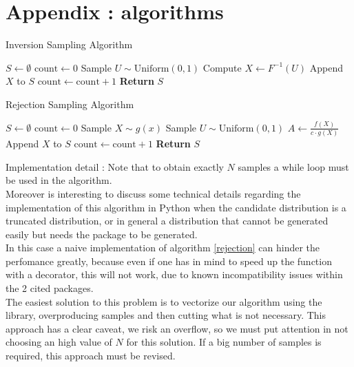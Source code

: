 \chapter*{Appendix : algorithms}

\begin{algorithm}
    \caption{Inversion Sampling Algorithm}
    \begin{algorithmic}[1]
    \State \( S \leftarrow \emptyset \)
    \State \( \text{count} \leftarrow 0 \)
        \State Sample \( U \sim \text{Uniform}(0, 1) \) 
        \State Compute \( X \leftarrow F^{-1}(U) \) 
        \State Append \( X \) to \( S \)
        \State \( \text{count} \leftarrow \text{count} + 1 \)
    \EndWhile
    \State \textbf{Return} \( S \)
    \end{algorithmic}
    \label{inversion}
\end{algorithm}


\begin{algorithm}
    \caption{Rejection Sampling Algorithm}
    \begin{algorithmic}[1]
    \State \( S \leftarrow \emptyset \)
    \State \( \text{count} \leftarrow 0 \)
        \State Sample \( X \sim g(x) \) 
        \State Sample \( U \sim \text{Uniform}(0, 1) \) 
        \State \( A \leftarrow \frac{f(X)}{c \cdot g(X)} \) 
            \State Append \( X \) to \( S \)
            \State \( \text{count} \leftarrow \text{count} + 1 \)
        \EndIf
    \EndWhile
    \State \textbf{Return} \( S \)
    \end{algorithmic}
    \label{rejection}
    \end{algorithm}
    
\label{par:detail_rejection}  
Implementation detail : Note that to obtain exactly $N$ samples a while loop must be used in the algorithm. \\
Moreover is interesting to discuss some technical details regarding the implementation of this algorithm in Python when the candidate
distribution is a truncated distribution, or in general a distribution that cannot be generated easily but needs the  package
to be generated.\\
In this case a naive implementation of algorithm \ref{rejection} can hinder the perfomance greatly, because even if one has in mind to speed
up the function with a  decorator, this will not work, due to known incompatibility issues within the 2 cited packages. \\
The easiest solution to this problem is to vectorize our algorithm using the  library, overproducing samples 
and then cutting what is not necessary. This approach has a clear caveat, we risk an  overflow, so we must put attention
in not choosing an high value of $N$ for this solution. If a big number of samples is required, this approach must be revised.


